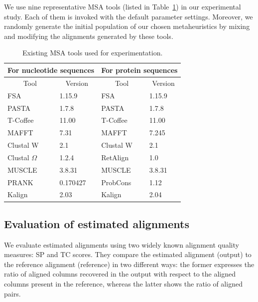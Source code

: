  We use nine representative MSA tools (listed in Table~\ref{tab:msa_tools}) in our experimental study. Each of them is invoked with the default parameter settings. Moreover, we randomly generate the initial population of our chosen metaheuristics by mixing and modifying the alignments generated by these tools. \begin{table}[htbp]
\centering
	\caption{ Existing MSA tools used for experimentation.}
	\begin{tabular}{|l|l||l|l|}
		\hline
		\multicolumn{2}{|c||}{For nucleotide sequences} & \multicolumn{2}{c|}{For protein sequences} \\
		\hline
		\multicolumn{1}{|c|}{Tool} & \multicolumn{1}{c||}{Version} & \multicolumn{1}{c|}{Tool} & \multicolumn{1}{c|}{Version} \\
		\hline
		FSA~\citep{bradley2009fast} & 1.15.9 & FSA   & 1.15.9 \\
		\hline
		PASTA~\citep{mirarab2015pasta} & 1.7.8 & PASTA & 1.7.8 \\
		\hline
		T-Coffee~\citep{notredame2000t} & 11.00 & T-Coffee & 11.00 \\
		\hline
		MAFFT~\citep{katoh2002mafft} & 7.31  & MAFFT & 7.245 \\
		\hline
		Clustal W~\citep{thompson1994clustal} & 2.1   & Clustal W & 2.1 \\
		\hline
		Clustal $ \Omega $~\citep{sievers2011fast} & 1.2.4 & RetAlign~\citep{szabo2010reticular} & 1.0 \\
		\hline
		MUSCLE~\citep{edgar2004muscle} & 3.8.31 & MUSCLE & 3.8.31 \\
		\hline
		PRANK~\citep{loytynoja2005algorithm} & 0.170427 & ProbCons~\citep{do2005probcons} & 1.12 \\
		\hline
		Kalign~\citep{lassmann2008kalign2} & 2.03  & Kalign & 2.04 \\
		\hline
	\end{tabular}\label{tab:msa_tools}\end{table}\subsection{Evaluation of estimated alignments}
\label{sec:msa_eval}
We evaluate estimated alignments using two widely known alignment quality measures: SP and TC scores. They compare the estimated alignment (output) to the reference alignment (reference) in two different ways: the former expresses the ratio of aligned columns recovered in the output with respect to the aligned columns present in the reference, whereas the latter shows the ratio of aligned pairs. 
